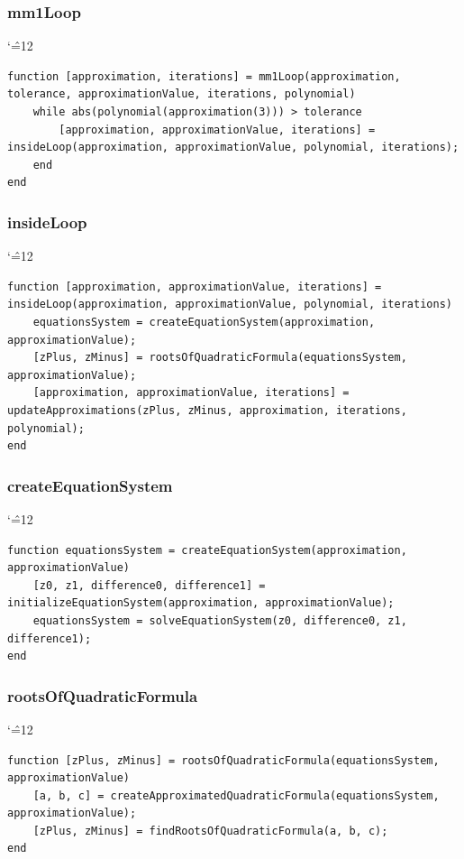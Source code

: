 \documentclass[12pt]{report}
\newenvironment{simplechar}{%
   \catcode`\^=12
}{}
\begin{document}
\subsubsection{mm1Loop}
\begin{simplechar}
\begin{lstlisting}
function [approximation, iterations] = mm1Loop(approximation, tolerance, approximationValue, iterations, polynomial)
    while abs(polynomial(approximation(3))) > tolerance
        [approximation, approximationValue, iterations] = insideLoop(approximation, approximationValue, polynomial, iterations);
    end
end
\end{lstlisting}
\end{simplechar}

\subsubsection{insideLoop}
\begin{simplechar}
\begin{lstlisting}
function [approximation, approximationValue, iterations] = insideLoop(approximation, approximationValue, polynomial, iterations)
    equationsSystem = createEquationSystem(approximation, approximationValue);
    [zPlus, zMinus] = rootsOfQuadraticFormula(equationsSystem, approximationValue);
    [approximation, approximationValue, iterations] = updateApproximations(zPlus, zMinus, approximation, iterations, polynomial);
end
\end{lstlisting}
\end{simplechar}

\subsubsection{createEquationSystem}
\begin{simplechar}
\begin{lstlisting}
function equationsSystem = createEquationSystem(approximation, approximationValue)
    [z0, z1, difference0, difference1] = initializeEquationSystem(approximation, approximationValue);
    equationsSystem = solveEquationSystem(z0, difference0, z1, difference1);
end
\end{lstlisting}
\end{simplechar}

\subsubsection{rootsOfQuadraticFormula}
\begin{simplechar}
\begin{lstlisting}
function [zPlus, zMinus] = rootsOfQuadraticFormula(equationsSystem, approximationValue)
    [a, b, c] = createApproximatedQuadraticFormula(equationsSystem, approximationValue);
    [zPlus, zMinus] = findRootsOfQuadraticFormula(a, b, c);
end
\end{lstlisting}
\end{simplechar}
\end{document}
